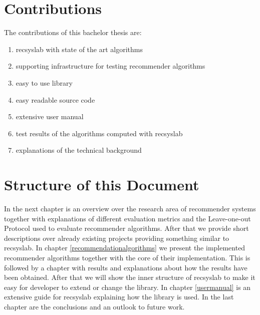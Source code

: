 \section{Contributions}
The contributions of this bachelor thesis are:
\begin{enumerate}
    \item recsyslab with state of the art algorithms
    \item supporting infrastructure for testing recommender algorithms
    \item easy to use library
    \item easy readable source code
    \item extensive user manual
    \item test results of the algorithms computed with recsyslab
    \item explanations of the technical background
\end{enumerate}


\section{Structure of this Document}
In the next chapter is an overview over the research area of recommender systems
together with explanations of different evaluation metrics and the Leave-one-out
Protocol used to evaluate recommender algorithms.
After that we provide short descriptions over already existing 
projects providing something similar to recsyslab.
In chapter \ref{recommendationalgorithms} we present the implemented recommender
algorithms together with the core of their implementation. 
This is followed by a chapter with results and explanations about how the
results have been obtained. After that we will show the inner structure of recsyslab
to make it easy for developer to extend or change the library.
In chapter \ref{usermanual} is an extensive guide for recsyslab explaining
how the library is used.
In the last chapter are the conclusions and an outlook to future work.
